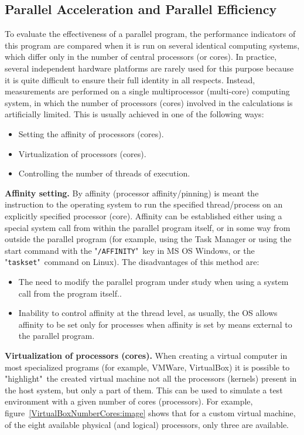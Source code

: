 { %
	\subsection{Parallel Acceleration and Parallel Efficiency}
	\par To evaluate the effectiveness of a parallel program, the performance indicators of this program are compared when it is run on several identical computing systems, which differ only in the number of central processors (or cores). In practice, several independent hardware platforms are rarely used for this purpose because it is quite difficult to ensure their full identity in all respects. Instead, measurements are performed on a single multiprocessor (multi-core) computing system, in which the number of processors (cores) involved in the calculations is artificially limited. This is usually achieved in one of the following ways:
	\begin{itemize}
		\item Setting the affinity of processors (cores).
		\item Virtualization of processors (cores).
		\item Controlling the number of threads of execution.
	\end{itemize}
	\textbf{Affinity setting.} By affinity (processor affinity/pinning) is meant the instruction to the operating system to run the specified thread/process on an explicitly specified processor (core). Affinity can be established either using a special system call from within the parallel program itself, or in some way from outside the parallel program (for example, using the Task Manager or using the start command with the "\texttt{/AFFINITY}"\ key in MS OS Windows, or the "\texttt{taskset}"\ command on Linux). The disadvantages of this method are:
	\begin{itemize}
		\item The need to modify the parallel program under study when using a system call from the program itself..
		\item Inability to control affinity at the thread level, as usually, the OS allows affinity to be set only for processes when affinity is set by means external to the parallel program.
	\end{itemize}
	\textbf{Virtualization of processors (cores).} When creating a virtual computer in most specialized programs (for example, VMWare, VirtualBox) it is possible to "highlight"\ the created virtual machine not all the processors (kernels) present in the host system, but only a part of them. This can be used to simulate a test environment with a given number of cores (processors). For example,  figure~\ref{VirtualBoxNumberCores:image} shows that for a custom virtual machine, of the eight available physical (and logical) processors, only three are available.
}
